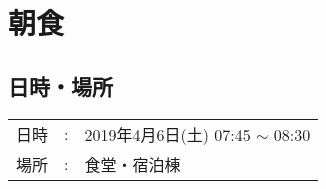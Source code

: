 
%

\section{朝食}

\subsection{日時・場所}

\begin{tabular}{p{}rp{}}
  日時 & : & 2019年4月6日(土) 07:45 $\sim$ 08:30\\
  場所 & : & 食堂・宿泊棟
\end{tabular}


